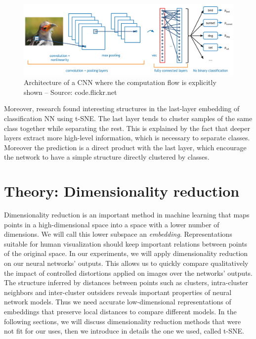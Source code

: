 \documentclass[a4paper,12pt]{report}
\begin{document}
\begin{figure}[t]
    \begin{center}
        \includegraphics[width=\textwidth]{thesis_figures/conv-net2.jpg}
    \end{center}
    \caption{Architecture of a CNN where the computation flow is explicitly shown -- Source: code.flickr.net}
    \label{fig:convnet}
\end{figure}

Moreover, research found interesting structures in the last-layer embedding of classification NN using t-SNE.
The last layer tends to cluster samples of the same class together while separating the rest\cite{donahue2013decaf}\cite{yu2014visualizing}.
This is explained by the fact that deeper layers extract more high-level information, which is necessary to separate classes. Moreover the prediction is a direct product with the last layer, which encourage the network to have a simple structure directly clustered by classes.


\chapter{Theory: Dimensionality reduction}
\label{chap:dim_red}
Dimensionality reduction is an important method in machine learning that maps points in a high-dimensional space into a space with a lower number of dimensions.
We will call this lower subspace an {\em embedding}.
Representations suitable for human visualization should keep important relations between points of the original space.
In our experiments, we will apply dimensionality reduction on our neural networks' outputs.
This allows us to quickly compare qualitatively the impact of controlled distortions applied on images over the networks' outputs.
The structure inferred by distances between points such as clusters, intra-cluster neighbors and inter-cluster outsiders reveals important properties of neural network models.
Thus we need accurate low-dimensional representations of embeddings that preserve local distances to compare different models.
In the following sections, we will discuss dimensionality reduction methods that were not fit for our uses, then we introduce in details the one we used, called t-SNE.
\end{document}
